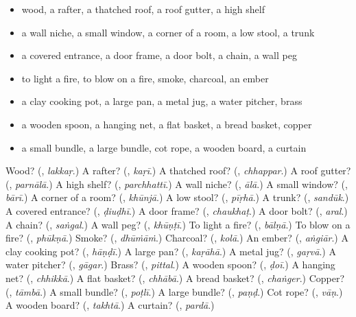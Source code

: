 \begin{itemize}
\raggedright
  \item wood, a rafter, a thatched roof, a roof gutter, a high shelf
  \item a wall niche, a small window, a corner of a room, a low stool, a trunk
  \item a covered entrance, a door frame, a door bolt, a chain, a wall peg
  \item to light a fire, to blow on a fire, smoke, charcoal, an ember
  \item a clay cooking pot, a large pan, a metal jug, a water pitcher, brass
  \item a wooden spoon, a hanging net, a flat basket, a bread basket, copper
  \item a small bundle, a large bundle, cot rope, a wooden board, a curtain
\end{itemize}

\begin{tcolorbox}[breakable,colback=teal!4,colframe=teal!35!black,title={Before you move on}]
Wood? (\textbf{}, \emph{lakkaṛ}.) A rafter? (\textbf{}, \emph{kaṛī}.) A thatched roof? (\textbf{}, \emph{chhappar}.) A roof gutter? (\textbf{}, \emph{parnālā}.) A high shelf? (\textbf{}, \emph{parchhattī}.) A wall niche? (\textbf{}, \emph{ālā}.) A small window? (\textbf{}, \emph{bārī}.) A corner of a room? (\textbf{}, \emph{khūnjā}.) A low stool? (\textbf{}, \emph{pīṛhā}.) A trunk? (\textbf{}, \emph{sandūk}.) A covered entrance? (\textbf{}, \emph{ḍiuḍhī}.) A door frame? (\textbf{}, \emph{chaukhaṭ}.) A door bolt? (\textbf{}, \emph{aral}.) A chain? (\textbf{}, \emph{saṅgal}.) A wall peg? (\textbf{}, \emph{khūṇṭī}.) To light a fire? (\textbf{}, \emph{bālṇā}.) To blow on a fire? (\textbf{}, \emph{phūkṇā}.) Smoke? (\textbf{}, \emph{dhūṁāṁ}.) Charcoal? (\textbf{}, \emph{kolā}.) An ember? (\textbf{}, \emph{aṅgiār}.) A clay cooking pot? (\textbf{}, \emph{hāṇḍī}.) A large pan? (\textbf{}, \emph{kaṛāhā}.) A metal jug? (\textbf{}, \emph{gaṛvā}.) A water pitcher? (\textbf{}, \emph{gāgar}.) Brass? (\textbf{}, \emph{pittal}.) A wooden spoon? (\textbf{}, \emph{ḍoī}.) A hanging net? (\textbf{}, \emph{chhikkā}.) A flat basket? (\textbf{}, \emph{chhābā}.) A bread basket? (\textbf{}, \emph{chaṅger}.) Copper? (\textbf{}, \emph{tāmbā}.) A small bundle? (\textbf{}, \emph{poṭlī}.) A large bundle? (\textbf{}, \emph{paṇḍ}.) Cot rope? (\textbf{}, \emph{vāṇ}.) A wooden board? (\textbf{}, \emph{takhtā}.) A curtain? (\textbf{}, \emph{pardā}.)
\end{tcolorbox}
